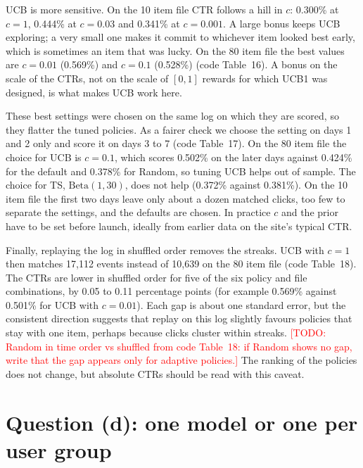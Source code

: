 \documentclass[11pt]{article}
\newcommand{\todo}[1]{\textcolor{red}{[TODO: #1]}}
\begin{document}
UCB is more sensitive. On the 10 item file CTR follows a hill in $c$: 0.300\%
at $c=1$, 0.444\% at $c=0.03$ and 0.341\% at $c=0.001$. A large bonus keeps
UCB exploring; a very small one makes it commit to whichever item looked best
early, which is sometimes an item that was lucky. On the 80 item file the best
values are $c=0.01$ (0.569\%) and $c=0.1$ (0.528\%) (code Table~16). A bonus
on the scale of the CTRs, not on the scale of $[0,1]$ rewards for which UCB1 was
designed, is what makes UCB work here.

These best settings were chosen on the same log on which they are scored, so
they flatter the tuned policies. As a fairer check we choose the setting on
days 1 and 2 only and score it on days 3 to 7 (code Table~17). On the 80 item
file the choice for UCB is $c=0.1$, which scores 0.502\% on the later days
against 0.424\% for the default and 0.378\% for Random, so tuning UCB helps out
of sample. The choice for TS, $\text{Beta}(1,30)$, does not help (0.372\%
against 0.381\%). On the 10 item file the first two days leave only about a dozen
matched clicks, too few to separate the settings, and the defaults are chosen. In
practice $c$ and the prior have to be set before launch, ideally from earlier
data on the site's typical CTR.

Finally, replaying the log in shuffled order removes the streaks. UCB with
$c=1$ then matches 17{,}112 events instead of 10{,}639 on the 80 item file
(code Table~18). The CTRs are lower in shuffled order for five of the six
policy and file combinations, by 0.05 to 0.11 percentage points (for example
0.569\% against 0.501\% for UCB with $c=0.01$). Each gap is about one standard
error, but the consistent direction suggests that replay on this log slightly
favours policies that stay with one item, perhaps because clicks cluster
within streaks. \todo{Random in time order vs shuffled from code Table~18:
if Random shows no gap, write that the gap appears only for adaptive
policies.} The ranking of the policies does not change, but absolute CTRs
should be read with this caveat.

\section{Question (d): one model or one per user group}
\label{sec:d}
\end{document}
